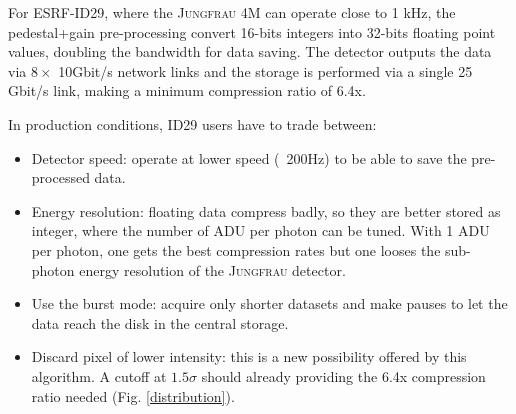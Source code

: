 \documentclass[preprint]{iucr}              %
\begin{document}
For ESRF-ID29, where the \textsc{Jungfrau} 4M can operate close to 1 kHz, the pedestal+gain pre-processing convert 16-bits integers into 32-bits floating point values, doubling the bandwidth for data saving.
The detector outputs the data via $8\times$ 10Gbit/s network links and the storage is performed via a single 25 Gbit/s link, making a minimum compression ratio of 6.4x.

In production conditions, ID29 users have to trade between:
\begin{itemize}
    \item Detector speed: operate at lower speed (~200Hz) to be able to save the pre-processed data.
    \item Energy resolution: floating data compress badly, so they are better stored as integer, where the number of ADU per photon can be tuned. With 1 ADU per photon, one gets the best compression rates but one looses the sub-photon energy resolution of the \textsc{Jungfrau} detector.
    \item  Use the burst mode: acquire only shorter datasets and make pauses to let the data reach the disk in the central storage.
    \item Discard pixel of lower intensity: this is a new possibility offered by this algorithm. 
    A cutoff at $1.5\sigma$ should already providing the 6.4x compression ratio needed (Fig. \ref{distribution}).
\end{itemize}
\end{document}
